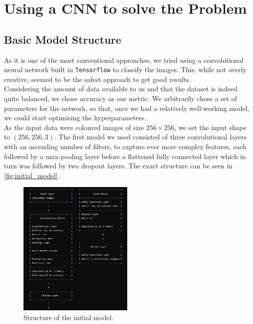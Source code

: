 \chapter{Using a CNN to solve the Problem}
\label{ch:solution}

\section{Basic Model Structure}

As it is one of the most conventional approaches, we tried using a convolutional neural network built in \texttt{Tensorflow} \cite{tensorflow} to classify the images.
This, while not overly creative, seemed to be the safest approach to get good results. \\

Considering the amount of data available to us and that the dataset is indeed quite balanced, we chose accuracy as our metric.
We arbitrarily chose a set of parameters for the network, so that, once we had a relatively well-working model,
we could start optimising the hyperparameters. \\

As the input data were coloured images of size $256 \times 256$, we set the input shape to $(256, 256, 3)$.
The first model we used consisted of three convolutional layers with an ascending number of filters, to capture ever more complex features, 
each followed by a max-pooling layer before a flattened fully connected layer which in turn was followed by two dropout layers.
The exact structure can be seen in \autoref{fig:initial_model}. \\

\begin{figure}[H]
    \centering
    \includegraphics[width=0.5\textwidth]{images/initial_model.png}
    \caption{Structure of the initial model.}
    \label{fig:initial_model}
\end{figure}

